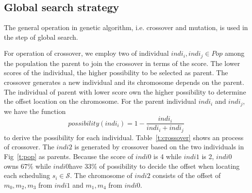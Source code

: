 \documentclass[journal]{IEEEtran}
\newcommand{\calS}{\mathcal{S}}
\begin{document}
\subsection{Global search strategy \label{s:glo}}

The general operation in genetic algorithm,
 i.e. crossover and mutation,
  is used in the step of global search. 

For operation of crossover,
 we employ two of individual $indi_i,indi_j\in Pop$ among the population the parent to join the crossover in terms of the score.
The lower scores of the individual,
 the higher possibility to be selected as parent.
The crossover generates a new individual and its chromosome depends on the parent.
The individual of parent with lower score own the higher possibility to determine the offset location on the chromosome.
For the parent individual $indi_i$ and $indi_j$, we have the function
\begin{equation}
	possibility(indi_i)=1-\frac{indi_i}{indi_i+indi_j}
\end{equation}
to derive the possibility for each individual.
Table~\ref{t:crossover} shows an process of crossover.
The $indi2$ is generated by crossover based on the two individuals in Fig~\ref{t:pop} as parents.
Because the score of $indi0$ is 4 while $indi1$ is 2,
 $indi0$ owns 67\% while $indi0 $have 33\% of possibility to decide the offset when locating each scheduling $s_i\in\calS$.
The chromosome of $indi2$ consists of the offset of $m_0,m_2,m_3$ from $indi1$ and $m_1,m_4$ from $indi0$.
\end{document}
